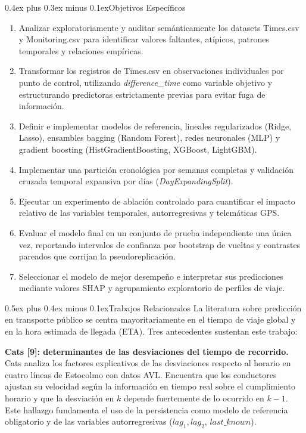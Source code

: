 \documentclass[conference]{IEEEtran}
\makeatletter
\def\section{\@startsection{section}{1}{\z@}{1.3ex plus 0.8ex minus 0.2ex}%
{0.5ex plus 0.4ex minus 0.1ex}{\normalfont\normalsize\bfseries\scshape\centering}}
\def\subsection{\@startsection{subsection}{2}{\z@}{1.0ex plus 0.6ex minus 0.2ex}%
{0.4ex plus 0.3ex minus 0.1ex}{\normalfont\normalsize\bfseries\itshape}}
\makeatother
\begin{document}
\subsection{Objetivos Específicos}
\begin{enumerate}
    \item Analizar exploratoriamente y auditar semánticamente los datasets Times.csv y Monitoring.csv para identificar valores faltantes, atípicos, patrones temporales y relaciones empíricas.
    \item Transformar los registros de Times.csv en observaciones individuales por punto de control, utilizando \textit{difference\_time} como variable objetivo y estructurando predictoras estrictamente previas para evitar fuga de información.
    \item Definir e implementar modelos de referencia, lineales regularizados (Ridge, Lasso), ensambles bagging (Random Forest), redes neuronales (MLP) y gradient boosting (HistGradientBoosting, XGBoost, LightGBM).
    \item Implementar una partición cronológica por semanas completas y validación cruzada temporal expansiva por días (\textit{DayExpandingSplit}).
    \item Ejecutar un experimento de ablación controlado para cuantificar el impacto relativo de las variables temporales, autorregresivas y telemáticas GPS.
    \item Evaluar el modelo final en un conjunto de prueba independiente una única vez, reportando intervalos de confianza por bootstrap de vueltas y contrastes pareados que corrijan la pseudoreplicación.
    \item Seleccionar el modelo de mejor desempeño e interpretar sus predicciones mediante valores SHAP y agrupamiento exploratorio de perfiles de viaje.
\end{enumerate}

\section{Trabajos Relacionados}
La literatura sobre predicción en transporte público se centra mayoritariamente en el tiempo de viaje global y en la hora estimada de llegada (ETA). Tres antecedentes sustentan este trabajo:

\textbf{Cats [9]: determinantes de las desviaciones del tiempo de recorrido.} Cats analiza los factores explicativos de las desviaciones respecto al horario en cuatro líneas de Estocolmo con datos AVL. Encuentra que los conductores ajustan su velocidad según la información en tiempo real sobre el cumplimiento horario y que la desviación en $k$ depende fuertemente de lo ocurrido en $k-1$. Este hallazgo fundamenta el uso de la persistencia como modelo de referencia obligatorio y de las variables autorregresivas ($lag_1, lag_2$, $last\_known$).
\end{document}
